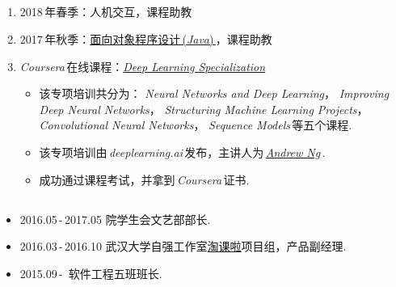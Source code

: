 \documentclass[letterpaper,AutoFakeBold]{twentysecondcv} %
\begin{document}
\begin{CJK*}{UTF8}{gbsn}

\begin{CJK*}{UTF8}{gkai}
\section{}
\end{CJK*}


\begin{enumerate}
	\setlength{\itemsep}{0pt}
	\setlength{\parsep}{0pt}
	\setlength{\parskip}{0pt}
	\item 2018\,年春季：人机交互，课程助教
	\item 2017\,年秋季：\href{http://www.javatree.cn/}{面向对象程序设计\,(\emph{Java})\,}，课程助教
	\item \emph{Coursera\,}在线课程：\href{https://www.coursera.org/specializations/deep-learning}{\emph{Deep Learning Specialization}}
		\begin{itemize}
			\item 该专项培训共分为：
			\emph{Neural Networks and Deep Learning}，
			\emph{Improving Deep Neural Networks}，
			\emph{Structuring Machine Learning Projects}，
			\emph{Convolutional Neural Networks}，
			\emph{Sequence Models}\,等五个课程.
			\item 该专项培训由\,\emph{deeplearning.ai}\,发布，主讲人为\,\href{https://www.coursera.org/instructor/andrewng}{\emph{Andrew Ng}}\,.
			\item 成功通过课程考试，并拿到\,\emph{Coursera}\,证书.
		\end{itemize}
\end{enumerate}


\begin{CJK*}{UTF8}{gkai}
	\section{}
	\end{CJK*}
	
	\begin{itemize}
		\setlength{\itemsep}{0pt}
		\setlength{\parsep}{0pt}
		\setlength{\parskip}{0pt}
		\item 2016.05\,-\,2017.05 \qquad 院学生会文艺部部长.
		\item 2016.03\,-\,2016.10 \qquad 武汉大学自强工作室\href{https://taoke.ziqiang.net.cn/}{淘课啦}项目组，产品副经理.
		\item 2015.09\,-\, \qquad \qquad \qquad 软件工程五班班长.
	\end{itemize}


\end{CJK*}
\end{document}
